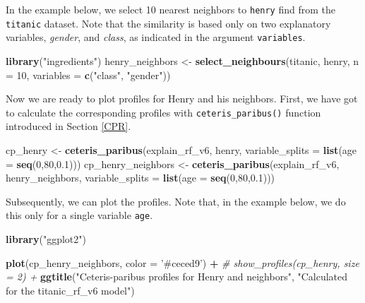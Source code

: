 \documentclass[12pt,]{krantz}
\newenvironment{Shaded}{\begin{snugshade}}{\end{snugshade}}
\newcommand{\CommentTok}[1]{\textcolor[rgb]{0.56,0.35,0.01}{\textit{#1}}}
\newcommand{\DataTypeTok}[1]{\textcolor[rgb]{0.13,0.29,0.53}{#1}}
\newcommand{\DecValTok}[1]{\textcolor[rgb]{0.00,0.00,0.81}{#1}}
\newcommand{\FloatTok}[1]{\textcolor[rgb]{0.00,0.00,0.81}{#1}}
\newcommand{\KeywordTok}[1]{\textcolor[rgb]{0.13,0.29,0.53}{\textbf{#1}}}
\newcommand{\NormalTok}[1]{#1}
\newcommand{\OperatorTok}[1]{\textcolor[rgb]{0.81,0.36,0.00}{\textbf{#1}}}
\newcommand{\StringTok}[1]{\textcolor[rgb]{0.31,0.60,0.02}{#1}}
\theoremstyle{definition}
\theoremstyle{definition}
\theoremstyle{definition}
\theoremstyle{remark}
\begin{document}
In the example below, we select 10 nearest neighbors to \texttt{henry}
find from the \texttt{titanic} dataset. Note that the similarity is
based only on two explanatory variables, \emph{gender}, and
\emph{class}, as indicated in the argument \texttt{variables}.

\begin{Shaded}
\begin{Highlighting}[]
\KeywordTok{library}\NormalTok{(}\StringTok{"ingredients"}\NormalTok{)}
\NormalTok{henry_neighbors <-}\StringTok{ }\KeywordTok{select_neighbours}\NormalTok{(titanic, }
\NormalTok{                         henry, }
                         \DataTypeTok{n =} \DecValTok{10}\NormalTok{, }
                         \DataTypeTok{variables =} \KeywordTok{c}\NormalTok{(}\StringTok{"class"}\NormalTok{, }\StringTok{"gender"}\NormalTok{))}
\end{Highlighting}
\end{Shaded}

Now we are ready to plot profiles for Henry and his neighbors. First, we
have got to calculate the corresponding profiles with
\texttt{ceteris\_paribus()} function introduced in Section \ref{CPR}.

\begin{Shaded}
\begin{Highlighting}[]
\NormalTok{cp_henry <-}\StringTok{ }\KeywordTok{ceteris_paribus}\NormalTok{(explain_rf_v6, }
\NormalTok{                            henry,}
                            \DataTypeTok{variable_splits =} \KeywordTok{list}\NormalTok{(}\DataTypeTok{age =} \KeywordTok{seq}\NormalTok{(}\DecValTok{0}\NormalTok{,}\DecValTok{80}\NormalTok{,}\FloatTok{0.1}\NormalTok{)))}
\NormalTok{cp_henry_neighbors <-}\StringTok{ }\KeywordTok{ceteris_paribus}\NormalTok{(explain_rf_v6, }
\NormalTok{                            henry_neighbors,}
                            \DataTypeTok{variable_splits =} \KeywordTok{list}\NormalTok{(}\DataTypeTok{age =} \KeywordTok{seq}\NormalTok{(}\DecValTok{0}\NormalTok{,}\DecValTok{80}\NormalTok{,}\FloatTok{0.1}\NormalTok{)))}
\end{Highlighting}
\end{Shaded}

Subsequently, we can plot the profiles. Note that, in the example below,
we do this only for a single variable \texttt{age}.

\begin{Shaded}
\begin{Highlighting}[]
\KeywordTok{library}\NormalTok{(}\StringTok{"ggplot2"}\NormalTok{)}

\KeywordTok{plot}\NormalTok{(cp_henry_neighbors, }\DataTypeTok{color =} \StringTok{'#ceced9'}\NormalTok{) }\OperatorTok{+}
\CommentTok{#  show_profiles(cp_henry, size = 2)  +}
\StringTok{  }\KeywordTok{ggtitle}\NormalTok{(}\StringTok{"Ceteris-paribus profiles for Henry and neighbors"}\NormalTok{, }\StringTok{"Calculated for the titanic_rf_v6 model"}\NormalTok{)}
\end{Highlighting}
\end{Shaded}
\end{document}
